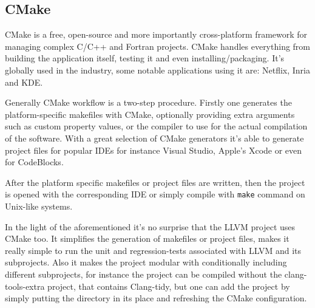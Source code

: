 \subsection{CMake}
\par CMake is a free, open-source and more importantly cross-platform framework for managing complex C/C++ and Fortran projects. CMake handles everything from building the application itself, testing it and even installing/packaging. It's globally used in the industry, some notable applications using it are: Netflix, Inria and KDE\cite{cmake_homepage}. \medskip
\par Generally CMake workflow is a two-step procedure. Firstly one generates the platform-specific makefiles with CMake, optionally providing extra arguments such as custom property values, or the compiler to use for the actual compilation of the software. With a great selection of CMake generators it's able to generate project files for popular IDEs for instance Visual Studio, Apple's Xcode or even for CodeBlocks\cite{cmake_generator_doc}. 
\par After the platform specific makefiles or project files are written, then the project is opened with the corresponding IDE or simply compile with \verb|make| command on Unix-like systems.
\par In the light of the aforementioned it's no surprise that the LLVM project uses CMake too. It simplifies the generation of makefiles or project files, makes it really simple to run the unit and regression-tests associated with LLVM and its subprojects. Also it makes the project modular with conditionally including different subprojects, for instance the project can be compiled without the clang-tools-extra project, that contains Clang-tidy, but one can add the project by simply putting the directory in its place and refreshing the CMake configuration. 